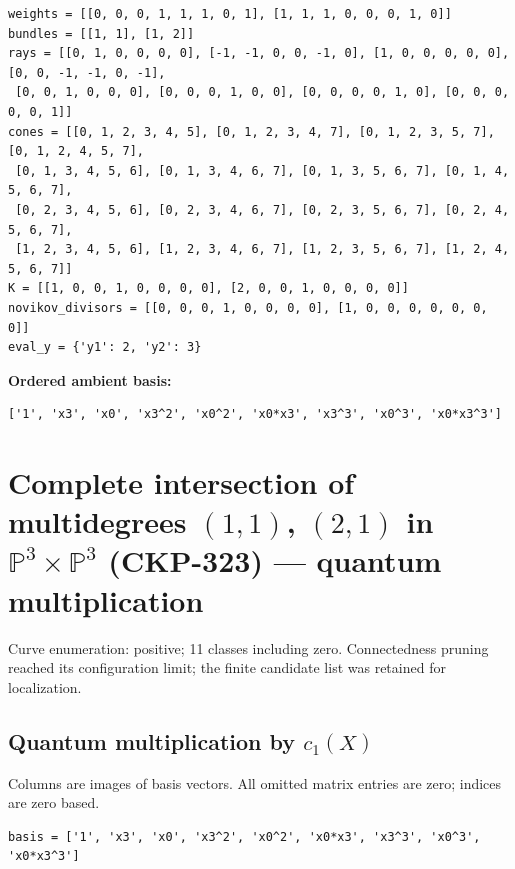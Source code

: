 \documentclass[10pt,a4paper]{article}
\begin{document}
\begin{lstlisting}
weights = [[0, 0, 0, 1, 1, 1, 0, 1], [1, 1, 1, 0, 0, 0, 1, 0]]
bundles = [[1, 1], [1, 2]]
rays = [[0, 1, 0, 0, 0, 0], [-1, -1, 0, 0, -1, 0], [1, 0, 0, 0, 0, 0], [0, 0, -1, -1, 0, -1],
 [0, 0, 1, 0, 0, 0], [0, 0, 0, 1, 0, 0], [0, 0, 0, 0, 1, 0], [0, 0, 0, 0, 0, 1]]
cones = [[0, 1, 2, 3, 4, 5], [0, 1, 2, 3, 4, 7], [0, 1, 2, 3, 5, 7], [0, 1, 2, 4, 5, 7],
 [0, 1, 3, 4, 5, 6], [0, 1, 3, 4, 6, 7], [0, 1, 3, 5, 6, 7], [0, 1, 4, 5, 6, 7],
 [0, 2, 3, 4, 5, 6], [0, 2, 3, 4, 6, 7], [0, 2, 3, 5, 6, 7], [0, 2, 4, 5, 6, 7],
 [1, 2, 3, 4, 5, 6], [1, 2, 3, 4, 6, 7], [1, 2, 3, 5, 6, 7], [1, 2, 4, 5, 6, 7]]
K = [[1, 0, 0, 1, 0, 0, 0, 0], [2, 0, 0, 1, 0, 0, 0, 0]]
novikov_divisors = [[0, 0, 0, 1, 0, 0, 0, 0], [1, 0, 0, 0, 0, 0, 0, 0]]
eval_y = {'y1': 2, 'y2': 3}
\end{lstlisting}

\textbf{Ordered ambient basis:}
\begin{lstlisting}
['1', 'x3', 'x0', 'x3^2', 'x0^2', 'x0*x3', 'x3^3', 'x0^3', 'x0*x3^3']
\end{lstlisting}

\clearpage\section*{Complete intersection of multidegrees $(1,1)$, $(2,1)$ in $\mathbb P^{3}\times \mathbb P^{3}$ (CKP-323) --- quantum multiplication}

Curve enumeration: positive; 11 classes including zero.
Connectedness pruning reached its configuration limit; the finite candidate list was retained for localization.
\subsection*{Quantum multiplication by $c_1(X)$}
Columns are images of basis vectors. All omitted matrix entries are zero; indices are zero based.

\begin{lstlisting}
basis = ['1', 'x3', 'x0', 'x3^2', 'x0^2', 'x0*x3', 'x3^3', 'x0^3', 'x0*x3^3']
\end{lstlisting}
\end{document}
